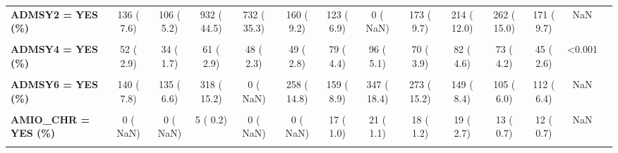 \documentclass[
]{article}
\begin{document}
\begin{table}[H]
\begin{tabular}[t]{>{\raggedright\arraybackslash}p{5em}ccccccccccccc}
\textbf{ADMSY2 = YES (\%)} & 136 (  7.6) & 106 (  5.2) & 932 ( 44.5) & 732 ( 35.3) & 160 (  9.2) & 123 (  6.9) & 0 (  NaN) & 173 (  9.7) & 214 ( 12.0) & 262 ( 15.0) & 171 (  9.7) & NaN & \\
\textbf{\cellcolor{gray!10}{ADMSY3 = YES (\%)}} & \cellcolor{gray!10}{115 (  6.4)} & \cellcolor{gray!10}{174 (  8.5)} & \cellcolor{gray!10}{177 (  8.5)} & \cellcolor{gray!10}{306 ( 14.7)} & \cellcolor{gray!10}{484 ( 27.7)} & \cellcolor{gray!10}{413 ( 23.2)} & \cellcolor{gray!10}{477 ( 25.3)} & \cellcolor{gray!10}{468 ( 26.1)} & \cellcolor{gray!10}{485 ( 27.3)} & \cellcolor{gray!10}{337 ( 19.3)} & \cellcolor{gray!10}{330 ( 18.8)} & \cellcolor{gray!10}{<0.001} & \cellcolor{gray!10}{}\\
\textbf{ADMSY4 = YES (\%)} & 52 (  2.9) & 34 (  1.7) & 61 (  2.9) & 48 (  2.3) & 49 (  2.8) & 79 (  4.4) & 96 (  5.1) & 70 (  3.9) & 82 (  4.6) & 73 (  4.2) & 45 (  2.6) & <0.001 & \\
\textbf{\cellcolor{gray!10}{ADMSY5 = YES (\%)}} & \cellcolor{gray!10}{29 (  1.6)} & \cellcolor{gray!10}{53 (  2.6)} & \cellcolor{gray!10}{82 (  3.9)} & \cellcolor{gray!10}{51 (  2.5)} & \cellcolor{gray!10}{72 (  4.1)} & \cellcolor{gray!10}{83 (  4.7)} & \cellcolor{gray!10}{73 (  3.9)} & \cellcolor{gray!10}{50 (  2.8)} & \cellcolor{gray!10}{0 (  NaN)} & \cellcolor{gray!10}{0 (  NaN)} & \cellcolor{gray!10}{0 (  NaN)} & \cellcolor{gray!10}{NaN} & \cellcolor{gray!10}{}\\
\textbf{ADMSY6 = YES (\%)} & 140 (  7.8) & 135 (  6.6) & 318 ( 15.2) & 0 (  NaN) & 258 ( 14.8) & 159 (  8.9) & 347 ( 18.4) & 273 ( 15.2) & 149 (  8.4) & 105 (  6.0) & 112 (  6.4) & NaN & \\
\textbf{\cellcolor{gray!10}{AGE (mean (SD))}} & \cellcolor{gray!10}{63.84 (13.18)} & \cellcolor{gray!10}{64.07 (13.03)} & \cellcolor{gray!10}{64.16 (13.33)} & \cellcolor{gray!10}{63.46 (13.05)} & \cellcolor{gray!10}{63.26 (13.18)} & \cellcolor{gray!10}{63.64 (12.67)} & \cellcolor{gray!10}{63.97 (12.91)} & \cellcolor{gray!10}{64.67 (12.82)} & \cellcolor{gray!10}{64.28 (12.69)} & \cellcolor{gray!10}{64.20 (12.31)} & \cellcolor{gray!10}{64.81 (12.11)} & \cellcolor{gray!10}{0.006} & \cellcolor{gray!10}{}\\
\textbf{AMIO\_CHR = YES (\%)} & 0 (  NaN) & 0 (  NaN) & 5 (  0.2) & 0 (  NaN) & 0 (  NaN) & 17 (  1.0) & 21 (  1.1) & 18 (  1.2) & 19 (  2.7) & 13 (  0.7) & 12 (  0.7) & NaN & \\
\textbf{\cellcolor{gray!10}{AMIT (\%)}} & \cellcolor{gray!10}{} & \cellcolor{gray!10}{} & \cellcolor{gray!10}{} & \cellcolor{gray!10}{} & \cellcolor{gray!10}{} & \cellcolor{gray!10}{} & \cellcolor{gray!10}{} & \cellcolor{gray!10}{} & \cellcolor{gray!10}{} & \cellcolor{gray!10}{} & \cellcolor{gray!10}{} & \cellcolor{gray!10}{NaN} & \cellcolor{gray!10}{}\\

\end{tabular}
\end{table}
\end{document}

